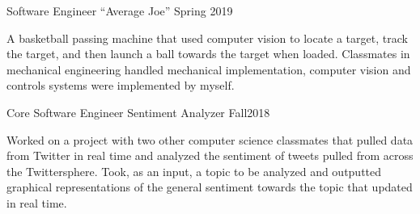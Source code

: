 

\begin{cventries}

  \cventry
    {Software Engineer} %
    {“Average Joe”} %
    {} %
    {Spring 2019} %
    {
      \begin{cvitems} %
        \item {A basketball passing machine that used computer vision to locate a target, track the target, and then launch a ball towards the target when loaded. Classmates in mechanical engineering handled mechanical implementation, computer vision and controls systems were implemented by myself.}
      \end{cvitems}
    }

  \cventry
    {Core Software Engineer} %
    {Sentiment Analyzer} %
    {} %
    {Fall2018} %
    {
      \begin{cvitems} %
        \item {Worked on a project with two other computer science classmates that pulled data from Twitter in real time and analyzed the sentiment of tweets pulled from across the Twittersphere. Took, as an input, a topic to be analyzed and outputted graphical representations of the general sentiment towards the topic that updated in real time.}
      \end{cvitems}
    }

\end{cventries}
